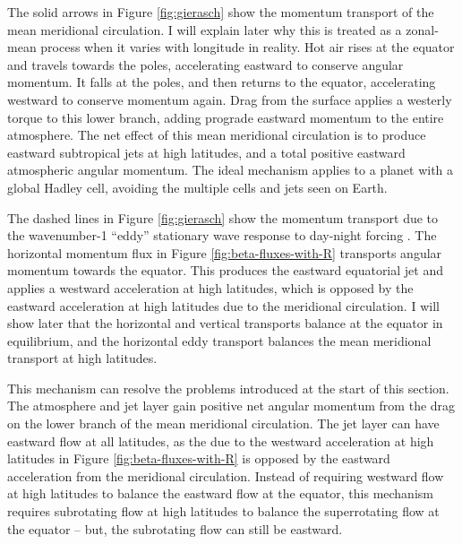The solid arrows in Figure \ref{fig:gierasch} show the momentum transport of the mean meridional circulation. I will explain later why this is treated as a zonal-mean process when it varies with longitude in reality. Hot air rises at the equator and travels towards the poles, accelerating eastward to conserve angular momentum. It falls at the poles, and then returns to the equator, accelerating westward to conserve momentum again. Drag from the surface applies a westerly torque to this lower branch, adding prograde eastward momentum to the entire atmosphere. The net effect of this mean meridional circulation is to produce eastward subtropical jets at high latitudes, and a total positive eastward atmospheric angular momentum. The ideal mechanism applies to a planet with a global Hadley cell, avoiding the multiple cells and jets seen on Earth.

The dashed lines in Figure \ref{fig:gierasch} show the momentum transport due to the wavenumber-1 ``eddy'' stationary wave response to day-night forcing \citep{showman2011superrotation}. The horizontal momentum flux in Figure \ref{fig:beta-fluxes-with-R} transports angular momentum towards the equator. This produces the eastward equatorial jet and applies a westward acceleration at high latitudes, which is opposed by the eastward acceleration at high latitudes due to the meridional circulation. I will show later that the horizontal and vertical transports balance at the equator in equilibrium, and the horizontal eddy transport balances the mean meridional transport at high latitudes.

This mechanism can resolve the problems introduced at the start of this section. The atmosphere and jet layer gain positive net angular momentum from the drag on the lower branch of the mean meridional circulation. The jet layer can have eastward flow at all latitudes, as the due to the westward acceleration at high latitudes in Figure \ref{fig:beta-fluxes-with-R} is opposed by the eastward acceleration from the meridional circulation. Instead of requiring westward flow at high latitudes to balance the eastward flow at the equator, this mechanism requires subrotating flow at high latitudes to balance the superrotating flow at the equator -- but, the subrotating flow can still be eastward.


